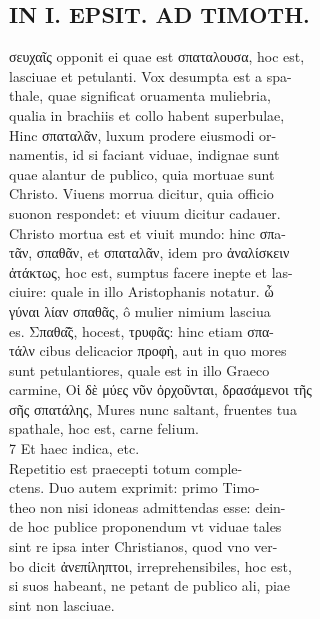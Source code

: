 \documentclass{article}
\begin{document}
\begin{pages}
\section*{IN I. EPSIT. AD TIMOTH. \\
                }σευχαῖς opponit ei quae est σπαταλουσα, hoc est, \\
                lasciuae et petulanti. Vox desumpta est a spa- \\
                thale, quae significat oruamenta muliebria, \\
                qualia in brachiis et collo habent superbulae, \\
                Hinc σπαταλᾶν, luxum prodere eiusmodi or- \\
                namentis, id si faciant viduae, indignae sunt \\
                quae alantur de publico, quia mortuae sunt \\
                Christo. Viuens morrua dicitur, quia officio \\
                suonon respondet: et viuum dicitur cadauer. \\
                Christo mortua est et viuit mundo: hinc σπa- \\
                τᾶν, σπαθᾶν, et σπαταλᾶν, idem pro ἀναλίσκειν \\
                ἀτάκτως, hoc est, sumptus facere inepte et las- \\
                ciuire: quale in illo Aristophanis notatur. ὦ \\
                γύναι λίαν σπαθᾶς, ô mulier nimium lasciua \\
                es. Σπαθα̃͂ς, hocest, τρυφᾶς: hinc etiam σπα- \\
                τάλν cibus delicacior προφὴ, aut in quo mores \\
                sunt petulantiores, quale est in illo Graeco \\
                carmine, Οἱ δὲ μύες νῦν ὀρχοῦνται, δρασάμενοι τῆς \\
                σῆς σπατάλης, Mures nunc saltant, fruentes tua \\
                spathale, hoc est, carne felium. \\
                7 Et haec indica, etc. \\
                Repetitio est praecepti totum comple- \\
                ctens. Duo autem exprimit: primo Timo- \\
                theo non nisi idoneas admittendas esse: dein- \\
                de hoc publice proponendum vt viduae tales \\
                sint re ipsa inter Christianos, quod vno ver- \\
                bo dicit ἀνεπίληπτοι, irreprehensibiles, hoc est, \\
                si suos habeant, ne petant de publico ali, piae \\
                sint non lasciuae. \\
                

\end{pages}
\end{document}
